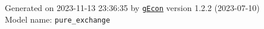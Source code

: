 \documentclass[10pt,a4paper]{article}
\numberwithin{equation}{section}
\begin{document}
\begin{flushleft}{\large
Generated  on 2023-11-13 23:36:35 by \href{http://gecon.r-forge.r-project.org/}{\texttt{gEcon}} version 1.2.2 (2023-07-10)\\
Model name: \verb+pure_exchange+
}\end{flushleft}



\end{document}
